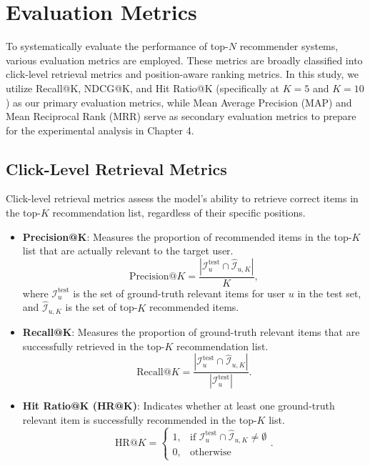 \section{Evaluation Metrics}

To systematically evaluate the performance of top-\(N\) recommender systems, various evaluation metrics are employed. These metrics are broadly classified into click-level retrieval metrics and position-aware ranking metrics. In this study, we utilize Recall@K, NDCG@K, and Hit Ratio@K (specifically at \(K=5\) and \(K=10\)) as our primary evaluation metrics, while Mean Average Precision (MAP) and Mean Reciprocal Rank (MRR) serve as secondary evaluation metrics to prepare for the experimental analysis in Chapter 4.

\subsection{Click-Level Retrieval Metrics}

Click-level retrieval metrics assess the model's ability to retrieve correct items in the top-\(K\) recommendation list, regardless of their specific positions.

\begin{itemize}
    \item \textbf{Precision@K}: Measures the proportion of recommended items in the top-\(K\) list that are actually relevant to the target user.
    \begin{equation}
        \text{Precision}@K = \frac{|\mathcal{I}_u^{\text{test}} \cap \hat{\mathcal{I}}_{u,K}|}{K},
    \end{equation}
    where \(\mathcal{I}_u^{\text{test}}\) is the set of ground-truth relevant items for user \(u\) in the test set, and \(\hat{\mathcal{I}}_{u,K}\) is the set of top-\(K\) recommended items.
    
    \item \textbf{Recall@K}: Measures the proportion of ground-truth relevant items that are successfully retrieved in the top-\(K\) recommendation list.
    \begin{equation}
        \text{Recall}@K = \frac{|\mathcal{I}_u^{\text{test}} \cap \hat{\mathcal{I}}_{u,K}|}{|\mathcal{I}_u^{\text{test}}|}.
    \end{equation}
    
    \item \textbf{Hit Ratio@K (HR@K)}: Indicates whether at least one ground-truth relevant item is successfully recommended in the top-\(K\) list.
    \begin{equation}
        \text{HR}@K = \begin{cases}
            1, & \text{if } \mathcal{I}_u^{\text{test}} \cap \hat{\mathcal{I}}_{u,K} \neq \emptyset \\
            0, & \text{otherwise}
        \end{cases}.
    \end{equation}
\end{itemize}


